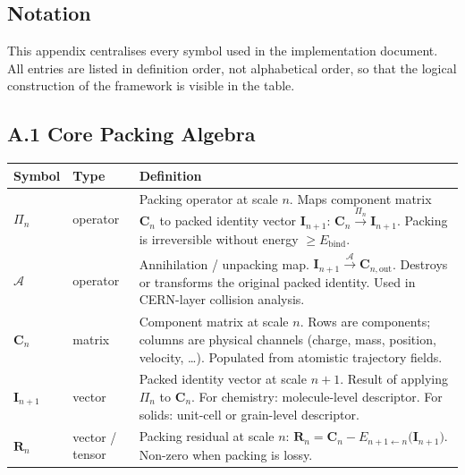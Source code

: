 \documentclass[11pt, a4paper, oneside]{article}
\newcommand{\Pack}[1]{\Pi_{#1}}
\newcommand{\Ann}{\mathcal{A}}
\newcommand{\Comp}[1]{\mathbf{C}_{#1}}
\newcommand{\Ident}[1]{\mathbf{I}_{#1}}
\newcommand{\Resid}[1]{\mathbf{R}_{#1}}
\newcommand{\Embed}[2]{E_{#2 \leftarrow #1}}
\begin{document}
\begin{appendices}

\section{Notation}
\label{app:A}

This appendix centralises every symbol used in the implementation document.
All entries are listed in definition order, not alphabetical order, so that
the logical construction of the framework is visible in the table.

\subsection*{A.1 Core Packing Algebra}

\begin{longtable}{p{3.2cm} p{2.2cm} p{8.8cm}}
  \toprule
  \textbf{Symbol} & \textbf{Type} & \textbf{Definition} \\
  \midrule
  \endhead
  $\Pack{n}$ & operator &
	Packing operator at scale $n$. Maps component matrix
	$\Comp{n}$ to packed identity vector $\Ident{n+1}$:
	$\Comp{n} \xrightarrow{\Pack{n}} \Ident{n+1}$.
	Packing is irreversible without energy $\geq E_{\mathrm{bind}}$. \\[4pt]

  $\Ann$ & operator &
	Annihilation / unpacking map.
	$\Ident{n+1} \xrightarrow{\Ann} \Comp{n,\mathrm{out}}$.
	Destroys or transforms the original packed identity.
	Used in CERN-layer collision analysis. \\[4pt]

  $\Comp{n}$ & matrix &
	Component matrix at scale $n$.
	Rows are components; columns are physical channels
	(charge, mass, position, velocity, \ldots).
	Populated from atomistic trajectory fields. \\[4pt]

  $\Ident{n+1}$ & vector &
	Packed identity vector at scale $n+1$.
	Result of applying $\Pack{n}$ to $\Comp{n}$.
	For chemistry: molecule-level descriptor.
	For solids: unit-cell or grain-level descriptor. \\[4pt]

  $\Resid{n}$ & vector / tensor &
	Packing residual at scale $n$:
	$\Resid{n} = \Comp{n} - \Embed{n}{n+1}\!\bigl(\Ident{n+1}\bigr)$.
	Non-zero when packing is lossy. \\[4pt]


\end{longtable}
\end{appendices}
\end{document}
